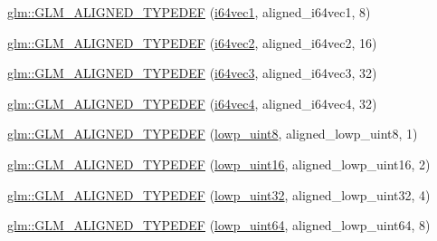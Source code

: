\begin{DoxyCompactItemize}
\item 
\mbox{\hyperlink{group__gtx__type__aligned_ga965b1c9aa1800e93d4abc2eb2b5afcbf}{glm\+::\+G\+L\+M\+\_\+\+A\+L\+I\+G\+N\+E\+D\+\_\+\+T\+Y\+P\+E\+D\+EF}} (\mbox{\hyperlink{group__gtc__type__precision_gad2bbfb4ed2d4b1e1551c721f81739e49}{i64vec1}}, aligned\+\_\+i64vec1, 8)
\item 
\mbox{\hyperlink{group__gtx__type__aligned_ga1f9e9c2ea2768675dff9bae5cde2d829}{glm\+::\+G\+L\+M\+\_\+\+A\+L\+I\+G\+N\+E\+D\+\_\+\+T\+Y\+P\+E\+D\+EF}} (\mbox{\hyperlink{group__gtc__type__precision_ga8654a1b3a6f81677f53eec13f8dd4224}{i64vec2}}, aligned\+\_\+i64vec2, 16)
\item 
\mbox{\hyperlink{group__gtx__type__aligned_gad77c317b7d942322cd5be4c8127b3187}{glm\+::\+G\+L\+M\+\_\+\+A\+L\+I\+G\+N\+E\+D\+\_\+\+T\+Y\+P\+E\+D\+EF}} (\mbox{\hyperlink{group__gtc__type__precision_gad7aa290b2d88847999c1305ed5c82669}{i64vec3}}, aligned\+\_\+i64vec3, 32)
\item 
\mbox{\hyperlink{group__gtx__type__aligned_ga716f8ea809bdb11b5b542d8b71aeb04f}{glm\+::\+G\+L\+M\+\_\+\+A\+L\+I\+G\+N\+E\+D\+\_\+\+T\+Y\+P\+E\+D\+EF}} (\mbox{\hyperlink{group__gtc__type__precision_ga77db970d924dd55ac93e00391ad4a10e}{i64vec4}}, aligned\+\_\+i64vec4, 32)
\item 
\mbox{\hyperlink{group__gtx__type__aligned_gad46f8e9082d5878b1bc04f9c1471cdaa}{glm\+::\+G\+L\+M\+\_\+\+A\+L\+I\+G\+N\+E\+D\+\_\+\+T\+Y\+P\+E\+D\+EF}} (\mbox{\hyperlink{group__gtc__type__precision_ga4d9dc08b7b248a386dfe9afd00fc6b1e}{lowp\+\_\+uint8}}, aligned\+\_\+lowp\+\_\+uint8, 1)
\item 
\mbox{\hyperlink{group__gtx__type__aligned_ga1246094581af624aca6c7499aaabf801}{glm\+::\+G\+L\+M\+\_\+\+A\+L\+I\+G\+N\+E\+D\+\_\+\+T\+Y\+P\+E\+D\+EF}} (\mbox{\hyperlink{group__gtc__type__precision_ga9b8409887319f62f06e664f6ca121b9d}{lowp\+\_\+uint16}}, aligned\+\_\+lowp\+\_\+uint16, 2)
\item 
\mbox{\hyperlink{group__gtx__type__aligned_ga7a5009a1d0196bbf21dd7518f61f0249}{glm\+::\+G\+L\+M\+\_\+\+A\+L\+I\+G\+N\+E\+D\+\_\+\+T\+Y\+P\+E\+D\+EF}} (\mbox{\hyperlink{group__gtc__type__precision_gaf11e85af414720b4cd12bd57b3a81e68}{lowp\+\_\+uint32}}, aligned\+\_\+lowp\+\_\+uint32, 4)
\item 
\mbox{\hyperlink{group__gtx__type__aligned_ga45213fd18b3bb1df391671afefe4d1e7}{glm\+::\+G\+L\+M\+\_\+\+A\+L\+I\+G\+N\+E\+D\+\_\+\+T\+Y\+P\+E\+D\+EF}} (\mbox{\hyperlink{group__gtc__type__precision_gacf666a9d9b309c4615c7a4f2ab0be289}{lowp\+\_\+uint64}}, aligned\+\_\+lowp\+\_\+uint64, 8)
\item 

\end{DoxyCompactItemize}
